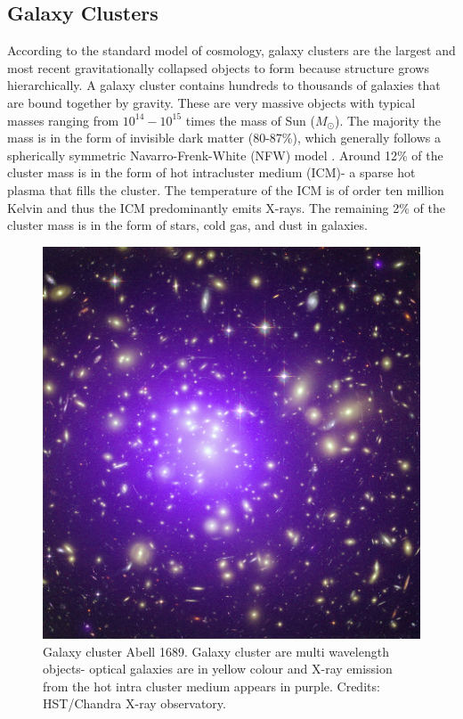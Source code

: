 \subsection{Galaxy Clusters}
According to the standard model of cosmology, galaxy clusters are the largest and most recent gravitationally collapsed objects to form because structure grows hierarchically. 
A galaxy cluster contains hundreds to thousands of galaxies that are bound together by gravity.
These are very massive objects with typical masses ranging from $10^{14} - 10^{15} $ times the mass of Sun ($M_{\odot}$). %
The majority the mass is in the form of invisible dark matter (80-87\%), which generally follows a spherically symmetric Navarro-Frenk-White (NFW) model  \citep{navarro97}. 
Around 12\% of the cluster mass is in the form of hot intracluster medium (ICM)- a sparse hot plasma that fills the cluster. 
The temperature of the ICM is of order ten million Kelvin and thus the ICM predominantly emits X-rays. 
The remaining 2\% of the cluster mass is in the form of stars, cold gas, and dust in galaxies.
\begin{figure}[H]
\includegraphics[width = \columnwidth]{figs/Abell_1689.jpg}
\caption{Galaxy cluster Abell 1689. Galaxy cluster are multi wavelength objects- optical galaxies are in yellow colour and X-ray emission from the hot intra cluster medium appears in purple.  Credits: HST/Chandra X-ray observatory. }
\label{cluster}
\end{figure}

